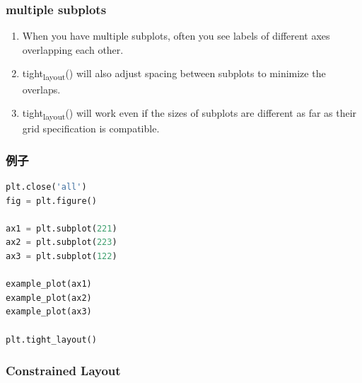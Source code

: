 \documentclass[UTF8,a4paper,12pt]{ctexart}  %
\providecommand{\tightlist}{\setlength{\itemsep}{0pt}\setlength{\parskip}{0pt}}
\begin{document}
\hypertarget{multiple-subplots}{%
\subsubsection{multiple subplots}\label{multiple-subplots}}

\begin{enumerate}
\def\labelenumi{\arabic{enumi}.}
\tightlist
\item
  When you have multiple subplots, often you see labels of different
  axes overlapping each other.
\item
  tight\textsubscript{layout}() will also adjust spacing between subplots to
  minimize the overlaps.
\item
  tight\textsubscript{layout}() will work even if the sizes of subplots are
  different as far as their grid specification is compatible.
\end{enumerate}

\hypertarget{ux4f8bux5b50-10}{%
\subsubsection{例子}\label{ux4f8bux5b50-10}}

\begin{lstlisting}[language=Python]
plt.close('all')
fig = plt.figure()

ax1 = plt.subplot(221)
ax2 = plt.subplot(223)
ax3 = plt.subplot(122)

example_plot(ax1)
example_plot(ax2)
example_plot(ax3)

plt.tight_layout()
\end{lstlisting}

\hypertarget{constrained-layout}{%
\subsubsection{Constrained Layout}\label{constrained-layout}}
\end{document}
